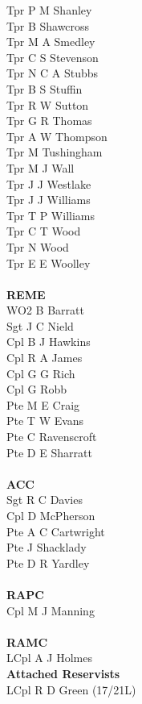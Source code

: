 \begin{multicols}{3}
  Tpr P M Shanley \\
  Tpr B Shawcross \\
  Tpr M A Smedley \\
  Tpr C S Stevenson \\
  Tpr N C A Stubbs \\
  Tpr B S Stuffin \\
  Tpr R W Sutton \\
  Tpr G R Thomas \\
  Tpr A W Thompson \\
  Tpr M Tushingham \\
  Tpr M J Wall \\
  Tpr J J Westlake \\
  Tpr J J Williams \\
  Tpr T P Williams \\
  Tpr C T Wood \\
  Tpr N Wood \\
  Tpr E E Woolley \\
  \\
  \textbf{REME} \\
  WO2 B Barratt \\
  Sgt J C Nield \\
  Cpl B J Hawkins \\
  Cpl R A James \\
  Cpl G G Rich \\
  Cpl G Robb \\
  Pte M E Craig \\
  Pte T W Evans \\
  Pte C Ravenscroft \\
  Pte D E Sharratt \\
  \\
  \textbf{ACC} \\
  Sgt R C Davies \\
  Cpl D McPherson \\
  Pte A C Cartwright \\
  Pte J Shacklady \\
  Pte D R Yardley \\
  \\
  \textbf{RAPC} \\
  Cpl M J Manning \\
  \\
  \textbf{RAMC} \\
  LCpl A J Holmes \\
  \textbf{Attached Reservists} \\
  LCpl R D Green (17/21L) \\

\end{multicols}
